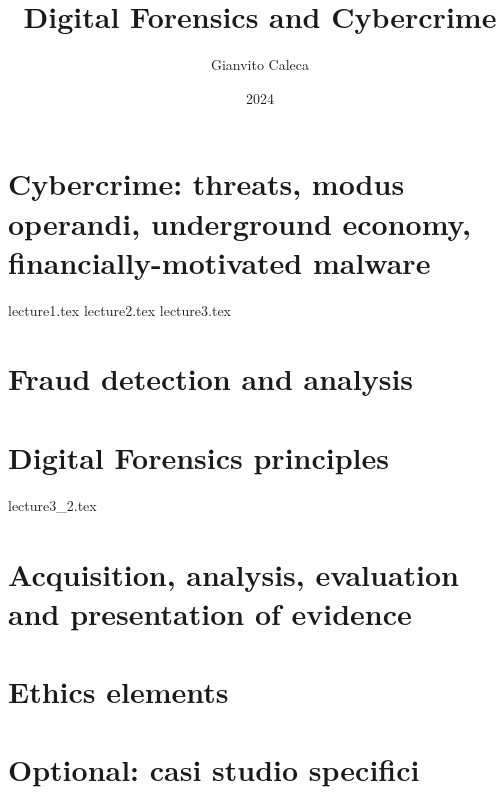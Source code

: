\documentclass{report}
\title{Digital Forensics and Cybercrime}
\date{2024}
\author{Gianvito Caleca}
\begin{document}
\maketitle
\tableofcontents
\part{Cybercrime: threats, modus operandi, underground economy, financially-motivated malware}
{lecture1.tex}
{lecture2.tex}
{lecture3.tex}
\part{Fraud detection and analysis}
\part{Digital Forensics principles}
{lecture3_2.tex}
\part{Acquisition, analysis, evaluation and presentation of evidence}
\part{Ethics elements}
\part{Optional: casi studio specifici}
\end{document}
